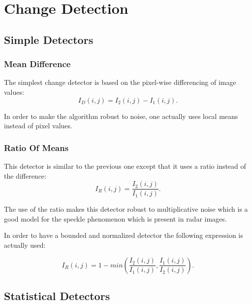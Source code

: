 \chapter{Change Detection}

\section{Simple Detectors}
\label{sec:SimpleDetectors}
\subsection{Mean Difference}
\label{sec:MeanDifference}

The simplest change detector is based on the pixel-wise differencing
of image values: 
\begin{equation}
I_{D}(i,j)=I_{2}(i,j)-I_{1}(i,j).
\end{equation}

In order to make the algorithm robust to noise, one actually uses
local means instead of pixel values.



\subsection{Ratio Of Means}
\label{sec:RatioOfMeans}

This detector is similar to the previous one except that it uses a
ratio instead of the difference:
\begin{equation}
\displaystyle I_{R}(i,j) = \frac{\displaystyle I_{2}(i,j)}{\displaystyle I_{1}(i,j)}.
\end{equation}

The use of the ratio makes this detector robust to multiplicative
noise which is a good model for the speckle phenomenon which is
present in radar images.

In order to have a bounded and normalized detector the following
expression is actually used:


\begin{equation}
\displaystyle I_{R}(i,j) = 1 - min \left(\frac{\displaystyle I_{2}(i,j)}{\displaystyle I_{1}(i,j)},\frac{\displaystyle I_{1}(i,j)}{\displaystyle I_{2}(i,j)}\right).
\end{equation}





\section{Statistical Detectors}
\label{sec:StatisticalDetectors}


